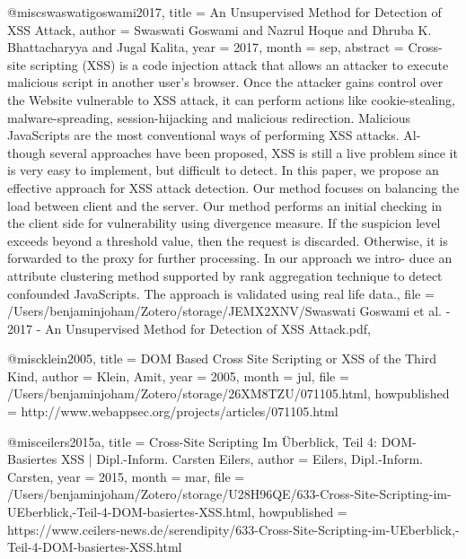 @misc{swaswatigoswami2017,
  title = {An {{Unsupervised Method}} for {{Detection}} of {{XSS Attack}}},
  author = {{Swaswati Goswami} and {Nazrul Hoque} and {Dhruba K. Bhattacharyya} and {Jugal Kalita}},
  year = {2017},
  month = sep,
  abstract = {Cross-site scripting (XSS) is a code injection attack that allows an attacker to execute malicious script in another user's browser. Once the attacker gains control over the Website vulnerable to XSS attack, it can perform actions like cookie-stealing, malware-spreading, session-hijacking and malicious redirection. Malicious JavaScripts are the most conventional ways of performing XSS attacks. Al- though several approaches have been proposed, XSS is still a live problem since it is very easy to implement, but difficult to detect. In this paper, we propose an effective approach for XSS attack detection. Our method focuses on balancing the load between client and the server. Our method performs an initial checking in the client side for vulnerability using divergence measure. If the suspicion level exceeds beyond a threshold value, then the request is discarded. Otherwise, it is forwarded to the proxy for further processing. In our approach we intro- duce an attribute clustering method supported by rank aggregation technique to detect confounded JavaScripts. The approach is validated using real life data.},
  file = {/Users/benjaminjoham/Zotero/storage/JEMX2XNV/Swaswati Goswami et al. - 2017 - An Unsupervised Method for Detection of XSS Attack.pdf},
}



@misc{klein2005,
  title = {{{DOM Based Cross Site Scripting}} or {{XSS}} of the {{Third Kind}}},
  author = {Klein, Amit},
  year = {2005},
  month = jul,
  file = {/Users/benjaminjoham/Zotero/storage/26XM8TZU/071105.html},
  howpublished = {http://www.webappsec.org/projects/articles/071105.html}
}



@misc{eilers2015a,
  title = {Cross-{{Site Scripting}} Im {{\"Uberblick}}, {{Teil}} 4: {{DOM}}-Basiertes {{XSS}} | {{Dipl}}.-{{Inform}}. {{Carsten Eilers}}},
  author = {Eilers, Dipl.-Inform. Carsten},
  year = {2015},
  month = mar,
  file = {/Users/benjaminjoham/Zotero/storage/U28H96QE/633-Cross-Site-Scripting-im-UEberblick,-Teil-4-DOM-basiertes-XSS.html},
  howpublished = {https://www.ceilers-news.de/serendipity/633-Cross-Site-Scripting-im-UEberblick,-Teil-4-DOM-basiertes-XSS.html}
}


